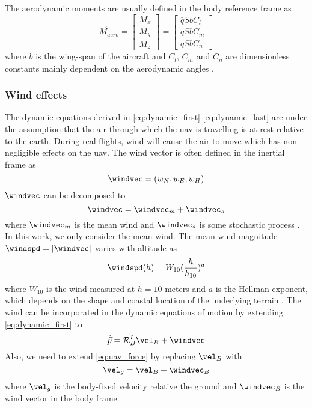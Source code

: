 The aerodynamic moments are usually defined in the body reference frame as
\begin{equation}\label{eq:dynamic_last}
    \vec{M}_{aero}=
    \begin{bmatrix}
        M_x \\
        M_y \\
        M_z
    \end{bmatrix}=
    \begin{bmatrix}
        \bar{q}SbC_l \\
        \bar{q}SbC_m \\
        \bar{q}SbC_n
    \end{bmatrix}
\end{equation}
where $b$ is the wing-span of the aircraft and $C_l$, $C_m$ and $C_n$ are dimensionless 
constants mainly dependent on the aerodynamic angles \cite{uav_dynamics_wind}. \\

\subsubsection{Wind effects}
The dynamic equations derived in \eqref{eq:dynamic_first}-\eqref{eq:dynamic_last} are under
the assumption that the air through which the \ac{uav} is travelling is at rest relative to the earth.
During real flights, wind will cause the air to move which has non-negligible effects on the \ac{uav}.
The wind vector is often defined in the inertial frame as
\begin{equation}
    \windvec=(w_N, w_E, w_H)
\end{equation}
$\windvec$ can be decomposed to
\begin{equation}
    \windvec=\windvec_{m}+\windvec_s
\end{equation}
where $\windvec_m$ is the mean wind and $\windvec_s$ is some stochastic process \cite{spline_trajectory}. In this work,
we only consider the mean wind.
The mean wind magnitude $\windspd=|\windvec|$ varies with altitude as
\begin{equation}
    \windspd(h)=W_{10}(\frac{h}{h_{10}})^a
\end{equation}
where $W_{10}$ is the wind measured at $h=10$ meters and $a$ is the Hellman exponent, which depends on
the shape and coastal location of the underlying terrain \cite{uav_dynamics_wind}. The wind can be 
incorporated in the dynamic equations of motion by extending \eqref{eq:dynamic_first} to
\begin{equation}
    \dot{\vec{p}}=\mathcal{R}^I_B\vel_B+\windvec
\end{equation}
Also, we need to extend \eqref{eq:uav_force} by replacing $\vel_B$ with
\begin{equation}
    \vel_g = \vel_B + \windvec_B
\end{equation} 
where $\vel_g$ is the body-fixed velocity relative the ground and $\windvec_B$ is the
wind vector in the body frame.

